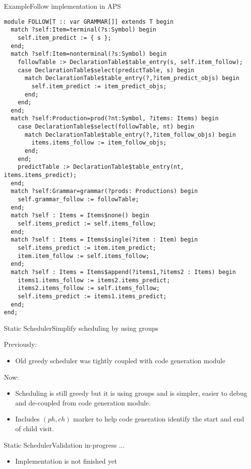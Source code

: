 \begin{frame}[fragile=singleslide]{Example}{Follow implementation in APS}

\begin{Verbatim}[fontsize=\fontsize{2.5}{4}\selectfont]
module FOLLOW[T :: var GRAMMAR[]] extends T begin
  match ?self:Item=terminal(?s:Symbol) begin
    self.item_predict := { s };
  end;
  match ?self:Item=nonterminal(?s:Symbol) begin
    followTable :> DeclarationTable$table_entry(s, self.item_follow);
    case DeclarationTable$select(predictTable, s) begin
      match DeclarationTable$table_entry(?,?item_predict_objs) begin
        self.item_predict := item_predict_objs;
      end;
    end;
  end;
  match ?self:Production=prod(?nt:Symbol, ?items: Items) begin
    case DeclarationTable$select(followTable, nt) begin
      match DeclarationTable$table_entry(?,?item_follow_objs) begin
        items.items_follow := item_follow_objs;
      end;
    end;
    predictTable :> DeclarationTable$table_entry(nt, items.items_predict);
  end;
  match ?self:Grammar=grammar(?prods: Productions) begin
    self.grammar_follow := followTable;
  end;
  match ?self : Items = Items$none() begin
    self.items_predict := self.items_follow;
  end;
  match ?self : Items = Items$single(?item : Item) begin
    self.items_predict := item.item_predict;
    item.item_follow := self.items_follow;
  end;
  match ?self : Items = Items$append(?items1,?items2 : Items) begin
    items1.items_follow := items2.items_predict;
    items2.items_follow := self.items_follow;
    self.items_predict := items1.items_predict;
  end;
end;
\end{Verbatim}

\end{frame}


\begin{frame}{Static Scheduler}{Simplify scheduling by using groups}

Previously:
\begin{itemize}
    \item Old greedy scheduler was \alert{tightly coupled with code generation} module
\end{itemize}
    
Now:
\begin{itemize}
    \item Scheduling is still greedy but it is using groups and is simpler, easier to debug and \alert{de-coupled from code generation} module.
    \item Includes $(\mathit{ph}, \mathit{ch})$ marker to help code generation identify the start and end of child visit.
\end{itemize}

\end{frame}



\begin{frame}{Static Scheduler}{Validation in-progress ...}

\begin{itemize}
    \item Implementation is \alert{not finished yet}
\end{itemize}

\end{frame}
